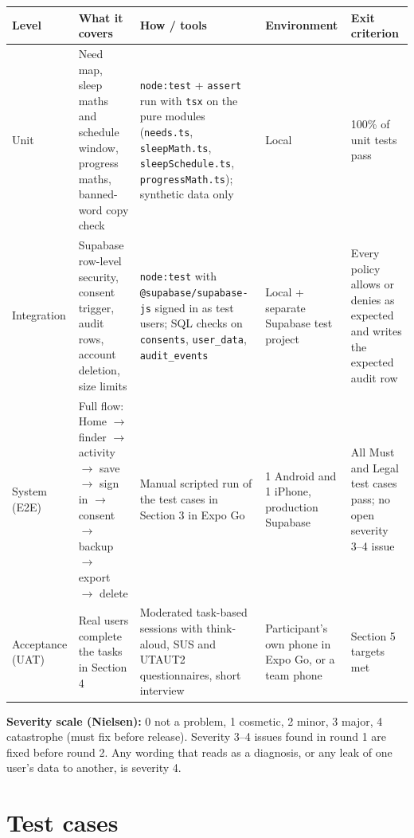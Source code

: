\documentclass{article}
\begin{document}
\begin{center}
\small
\begin{tabularx}{\linewidth}{|L{1.9cm}|L{3.2cm}|Y|L{2.4cm}|L{2.3cm}|}
\hline
\textbf{Level} & \textbf{What it covers} & \textbf{How / tools} & \textbf{Environment} & \textbf{Exit criterion} \\ \hline
Unit & Need map, sleep maths and schedule window, progress maths, banned-word copy check & \texttt{node:test} + \texttt{assert} run with \texttt{tsx} on the pure modules (\texttt{needs.ts}, \texttt{sleepMath.ts}, \texttt{sleepSchedule.ts}, \texttt{progressMath.ts}); synthetic data only & Local & 100\% of unit tests pass \\ \hline
Integration & Supabase row-level security, consent trigger, audit rows, account deletion, size limits & \texttt{node:test} with \texttt{@supabase/supabase-js} signed in as test users; SQL checks on \texttt{consents}, \texttt{user\_data}, \texttt{audit\_events} & Local + separate Supabase test project & Every policy allows or denies as expected and writes the expected audit row \\ \hline
System (E2E) & Full flow: Home $\rightarrow$ finder $\rightarrow$ activity $\rightarrow$ save $\rightarrow$ sign in $\rightarrow$ consent $\rightarrow$ backup $\rightarrow$ export $\rightarrow$ delete & Manual scripted run of the test cases in Section 3 in Expo Go & 1 Android and 1 iPhone, production Supabase & All Must and Legal test cases pass; no open severity 3--4 issue \\ \hline
Acceptance (UAT) & Real users complete the tasks in Section 4 & Moderated task-based sessions with think-aloud, SUS and UTAUT2 questionnaires, short interview & Participant's own phone in Expo Go, or a team phone & Section 5 targets met \\ \hline
\end{tabularx}
\end{center}

\textbf{Severity scale (Nielsen):} 0 not a problem, 1 cosmetic, 2 minor, 3 major, 4 catastrophe (must fix before release). Severity 3--4 issues found in round 1 are fixed before round 2. Any wording that reads as a diagnosis, or any leak of one user's data to another, is severity 4.

\section{Test cases}
\end{document}
